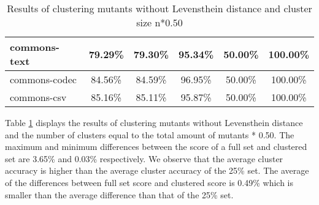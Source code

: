 \documentclass[../../main]{subfiles}
\begin{document}
\begin{table}[htb]
\begin{tabular}{|l|c|c|c|c|c|}
commons-text                  & 79.29\%                                                                                 & 79.30\%                                                                                     & 95.34\%                                                                              & 50.00\%                                                                               & 100.00\%                                                                             \\ \hline
commons-codec                 & 84.56\%                                                                                 & 84.59\%                                                                                     & 96.95\%                                                                              & 50.00\%                                                                               & 100.00\%                                                                             \\ \hline
commons-csv                   & 85.16\%                                                                                 & 85.11\%                                                                                     & 95.87\%                                                                              & 50.00\%                                                                               & 100.00\%                                                                             \\ \hline
\end{tabular}
\caption{\label{tab:clustering_no_distance_50}Results of clustering mutants without Levensthein distance and cluster size n*0.50}
\end{table}
\FloatBarrier

Table \ref{tab:clustering_no_distance_50} displays the results of clustering mutants without Levensthein distance and the number of clusters equal to the total amount of mutants * 0.50.
The maximum and minimum differences between the score of a full set and clustered set are 3.65\% and 0.03\% respectively.
We observe that the average cluster accuracy is higher than the average cluster accuracy of the 25\% set. 
The average of the differences between full set score and clustered score is 0.49\% which is smaller than the average difference than that of the 25\% set.
\end{document}
